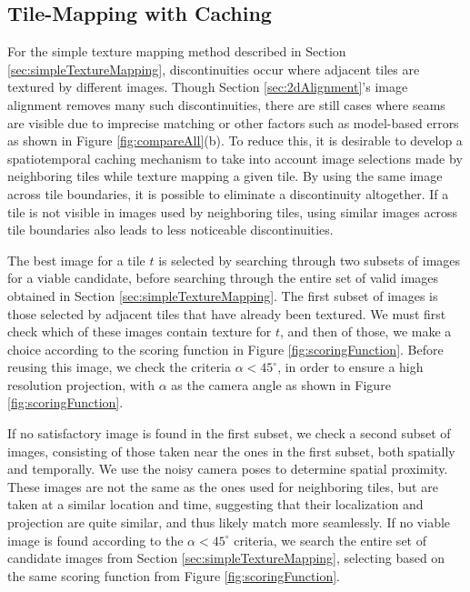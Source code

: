 \documentclass[]{spie}  %
\begin{document}
\subsection{Tile-Mapping with Caching}
\label{sec:mappingWithCaching}
For the simple texture mapping method described in Section
\ref{sec:simpleTextureMapping}, discontinuities occur where adjacent
tiles are textured by different images. Though Section
\ref{sec:2dAlignment}'s image alignment removes many such
discontinuities, there are still cases where seams are visible due to
imprecise matching or other factors such as model-based errors as
shown in Figure \ref{fig:compareAll}(b). To reduce this, it is
desirable to develop a spatiotemporal caching mechanism to take into
account image selections made by neighboring tiles while texture
mapping a given tile. By using the same image across tile boundaries,
it is possible to eliminate a discontinuity altogether. If a tile is
not visible in images used by neighboring tiles, using similar images
across tile boundaries also leads to less noticeable discontinuities.

The best image for a tile $t$ is selected by searching through two
subsets of images for a viable candidate, before searching through the
entire set of valid images obtained in Section
\ref{sec:simpleTextureMapping}. The first subset of images is those
selected by adjacent tiles that have already been textured. We must
first check which of these images contain texture for $t$, and then of
those, we make a choice according to the scoring function in Figure
\ref{fig:scoringFunction}. Before reusing this image, we check the
criteria $\alpha < 45^\circ$, in order to ensure a high resolution
projection, with $\alpha$ as the camera angle as shown in Figure
\ref{fig:scoringFunction}.

If no satisfactory image is found in the first subset, we check a
second subset of images, consisting of those taken near the ones in
the first subset, both spatially and temporally. We use the noisy
camera poses to determine spatial proximity. These images are not the
same as the ones used for neighboring tiles, but are taken at a
similar location and time, suggesting that their localization and
projection are quite similar, and thus likely match more
seamlessly. If no viable image is found according to the $\alpha <
45^\circ$ criteria, we search the entire set of candidate images from
Section \ref{sec:simpleTextureMapping}, selecting based on the same
scoring function from Figure \ref{fig:scoringFunction}.
\end{document}
